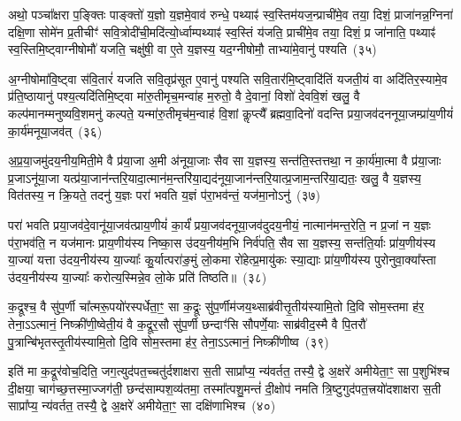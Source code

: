 अथो॒ पञ्चा᳚क्षरा प॒ङ्क्तिः पाङ्क्तो॑ य॒ज्ञो य॒ज्ञमे॒वाव॑ रुन्धे॒ पथ्याꣴ॑ स्व॒स्तिम॑यज॒न्प्राची॑मे॒व तया॒ दिशं॒ प्राजा॑नन्न॒ग्निना॑ दक्षि॒णा सोमे॑न प्र॒तीचीꣳ॑ सवि॒त्रोदी॑ची॒मदि॑त्यो॒र्ध्वाम्पथ्याꣴ॑ स्व॒स्तिं य॑जति॒ प्राची॑मे॒व तया॒ दिशं॒ प्र जा॑नाति॒ पथ्याꣴ॑ स्व॒स्तिमि॒ष्ट्वाग्नी\-षोमौ॑ यजति॒ चक्षु॑षी॒ वा ए॒ते य॒ज्ञस्य॒ यद॒ग्नी\-षोमौ॒ ताभ्या॑मे॒वानु॑ पश्यति~(३५)

अ॒ग्नी\-षोमा॑वि॒ष्ट्वा स॑वि॒तारं॑ यजति सवि॒तृप्र॑सूत ए॒वानु॑ पश्यति सवि॒तार॑मि॒ष्ट्वादि॑तिं यजती॒यं वा अदि॑तिर॒स्यामे॒व प्र॑ति॒ष्ठायानु॑ पश्य॒त्यदि॑तिमि॒ष्ट्वा मा॑रु॒तीमृच॒मन्वा॑ह म॒रुतो॒ वै दे॒वानां॒ विशो॑ देववि॒शं खलु॒ वै कल्प॑मानम्मनुष्यवि॒श\-मनु॑ कल्पते॒ यन्मा॑रु॒तीमृच॑म॒न्वाह॑ वि॒शां कॢप्त्यै᳚ ब्रह्मवा॒दिनो॑ वदन्ति प्रया॒जव॑दननूया॒जम्प्रा॑य॒णीयं॑ का॒र्य॑मनूया॒जव॑त्~(३६)

अ॒प्र॒या॒जमु॑दय॒नीय॒मिती॒मे वै प्र॑या॒जा अ॒मी अ॑नूया॒जाः सैव सा य॒ज्ञस्य॒ सन्त॑ति॒स्तत्तथा॒ न का॒र्य॑मा॒त्मा वै प्र॑या॒जाः प्र॒जाऽनू॑या॒जा यत्प्र॑या॒जान॑न्तरि॒यादा॒त्मान॑म॒न्तरि॑या॒द्यद॑नूया॒जान॑न्तरि॒यात्प्र॒जाम॒न्तरि॑या॒द्यतः॒ खलु॒ वै य॒ज्ञस्य॒ वित॑तस्य॒ न क्रि॒यते॒ तदनु॑ य॒ज्ञः परा॑ भवति य॒ज्ञं प॑रा॒भव॑न्तं॒ यज॑मा॒नो\-ऽनु॑~(३७)

परा॑ भवति प्रया॒जव॑दे॒वानू॑या॒जव॑त्प्राय॒णीयं॑ का॒र्यं॑ प्रया॒जव॑दनूया॒जव॑दुदय॒नीयं॒ नात्मान॑मन्त॒रेति॒ न प्र॒जां न य॒ज्ञः प॑रा॒भव॑ति॒ न यज॑मानः प्राय॒णीय॑स्य निष्का॒स उ॑दय॒नीय॑म॒भि निर्व॑पति॒ सैव सा य॒ज्ञस्य॒ सन्त॑ति॒र्याः प्रा॑य॒णीय॑स्य या॒ज्या॑ यत्ता उ॑दय॒नीय॑स्य या॒ज्याः᳚ कु॒र्यात्परा॑ङ॒मुं लो॒कमा रो॑हेत्प्र॒मायु॑कः स्या॒द्याः प्रा॑य॒णीय॑स्य पुरोनुवा॒क्या᳚स्ता उ॑दय॒नीय॑स्य या॒ज्याः᳚ करोत्य॒स्मिन्ने॒व लो॒के प्रति॑ तिष्ठति॥~(३८)

{\anuvakamend[{प्रज्ञा᳚त्यै पश्यत्यनूया॒जव॒द्यज॑मा॒नो\-ऽनु॑ पुरोनुवा॒क्या᳚स्ता अ॒ष्टौ च॑}]}%

क॒द्रूश्च॒ वै सु॑प॒र्णी चा᳚त्मरू॒पयो॑रस्पर्धेता॒ꣳ॒ सा क॒द्रूः सु॑प॒र्णीम॑जय॒थ्साब्र॑वीत्तृ॒तीय॑स्यामि॒तो दि॒वि सोम॒स्तमा ह॑र॒ तेना॒ऽऽत्मानं॒ निष्क्री॑णी॒ष्वेती॒यं वै क॒द्रूर॒सौ सु॑प॒र्णी छन्दाꣳ॑सि सौपर्णे॒याः साब्र॑वीद॒स्मै वै पि॒तरौ॑ पु॒त्रान्बि॑भृतस्तृ॒तीय॑स्यामि॒तो दि॒वि सोम॒स्तमा ह॑र॒ तेना॒ऽऽत्मानं॒ निष्क्री॑णीष्व~(३९)

इति॑ मा क॒द्रूर॑वोच॒दिति॒ जग॒त्युद॑पत॒च्चतु॑र्दशाक्षरा स॒ती साप्रा᳚प्य॒ न्य॑वर्तत॒ तस्यै॒ द्वे अ॒क्षरे॑ अमीयेता॒ꣳ॒ सा प॒शुभि॑श्च दी॒क्षया॒ चाग॑च्छ॒त्तस्मा॒ज्जग॑ती॒ छन्द॑साम्पश॒व्य॑तमा॒ तस्मा᳚त्पशु॒मन्तं॑ दी॒क्षोप॑ नमति त्रि॒ष्टुगुद॑पत॒त्त्रयो॑दशाक्षरा स॒ती साप्रा᳚प्य॒ न्य॑वर्तत॒ तस्यै॒ द्वे अ॒क्षरे॑ अमीयेता॒ꣳ॒ सा दक्षि॑णाभिश्च~(४०)

